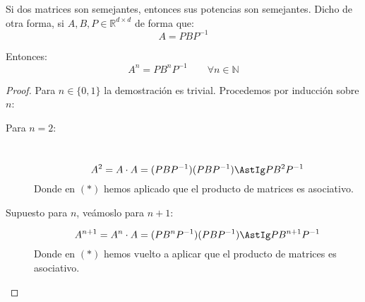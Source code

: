 \begin{lema}\label{lema:potencias_semejantes}
    Si dos matrices son semejantes, entonces sus potencias son semejantes. Dicho de otra forma, si $A,B,P\in \mathbb{R}^{d\times d}$ de forma que:
    \begin{equation*}
        A = PBP^{-1}
    \end{equation*}
    
    Entonces:
    \begin{equation*}
        A^n = PB^n P^{-1} \qquad \forall n\in \mathbb{N}
    \end{equation*}
    \begin{proof}
        Para $n\in \{0,1\}$ la demostración es trivial. Procedemos por inducción sobre $n$:
        \begin{description}
            \item [Para $n=2$:]~\\
                \begin{equation*}
                    A^2 = A\cdot A = (PBP^{-1})(PBP^{-1}) \AstIg PB^2P^{-1}
                \end{equation*}
                Donde en $(\ast)$ hemos aplicado que el producto de matrices es asociativo.
            \item [Supuesto para $n$, veámoslo para $n+1$:] 
                \begin{equation*}
                    A^{n+1} = A^n \cdot A = (PB^{n}P^{-1})(PBP^{-1}) \AstIg PB^{n+1}P^{-1}
                \end{equation*}
                Donde en $(\ast)$ hemos vuelto a aplicar que el producto de matrices es asociativo.
        \end{description}
    \end{proof}
\end{lema}


